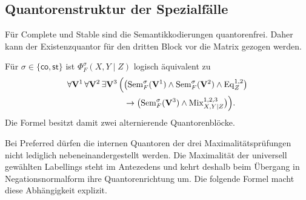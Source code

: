 \subsection{Quantorenstruktur der Spezialfälle}
\label{subsec:independence-prenex}

Für Complete und Stable sind die Semantikkodierungen quantorenfrei. Daher
kann der Existenzquantor für den dritten Block vor die Matrix gezogen
werden.

\begin{Proposition}
    \label{prop:co-st-independence-prenex}
    Für \(\sigma\in\{\mathsf{co},\mathsf{st}\}\) ist
    \(\Phi^\sigma_F(X,Y\mid Z)\) logisch äquivalent zu
    \[
    \begin{split}
        \forall\mathbf V^1\,\forall\mathbf V^2\,
        \exists\mathbf V^3\,
        \Bigl(&
        \bigl(
            \operatorname{Sem}^{\sigma}_F(\mathbf V^1)
            \land
            \operatorname{Sem}^{\sigma}_F(\mathbf V^2)
            \land
            \operatorname{Eq}^{1,2}_Z
        \bigr)
        \\
        &\rightarrow
        \bigl(
            \operatorname{Sem}^{\sigma}_F(\mathbf V^3)
            \land
            \operatorname{Mix}^{1,2,3}_{X,Y\mid Z}
        \bigr)
        \Bigr).
    \end{split}
    \]
    Die Formel besitzt damit zwei alternierende Quantorenblöcke.
\end{Proposition}

Bei Preferred dürfen die internen Quantoren der drei
Maximalitätsprüfungen nicht lediglich nebeneinandergestellt werden. Die
Maximalität der universell gewählten Labellings steht im Antezedens und
kehrt deshalb beim Übergang in Negationsnormalform ihre Quantorenrichtung
um. Die folgende Formel macht diese Abhängigkeit explizit.

